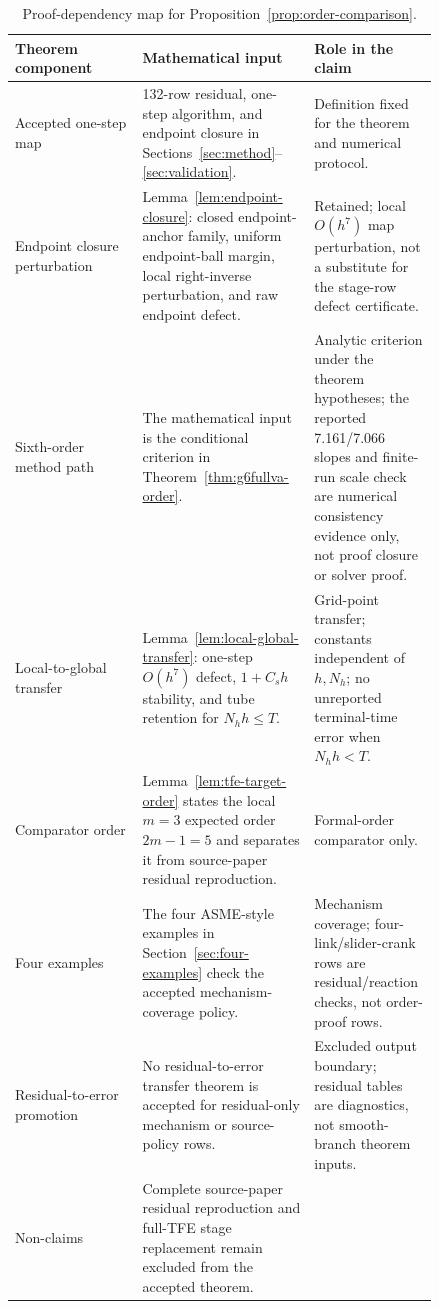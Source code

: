 \documentclass[preprint,12pt]{elsarticle}
\newcommand{\tfe}{TFE}
\begin{document}
\begin{table}[htbp]
\centering
\caption{Proof-dependency map for Proposition~\ref{prop:order-comparison}.}
\label{tab:proof-traceability}
\tiny
\setlength{\tabcolsep}{2pt}
\renewcommand{\arraystretch}{0.68}
\begin{tabular}{P{0.28\linewidth}P{0.36\linewidth}P{0.20\linewidth}}
\toprule
Theorem component & Mathematical input & Role in the claim \\
\midrule
Accepted one-step map &
132-row residual, one-step algorithm, and endpoint closure in
Sections~\ref{sec:method}--\ref{sec:validation}. &
Definition fixed for the theorem and numerical protocol. \\
Endpoint closure perturbation &
Lemma~\ref{lem:endpoint-closure}: closed endpoint-anchor family, uniform
endpoint-ball margin, local right-inverse perturbation, and raw endpoint
defect. &
Retained; local \(O(h^7)\) map perturbation, not a substitute for the
stage-row defect certificate. \\
Sixth-order method path &
The mathematical input is the conditional criterion in
Theorem~\ref{thm:g6fullva-order}. &
Analytic criterion under the theorem hypotheses; the reported 7.161/7.066 slopes and
finite-run scale check are numerical consistency evidence only, not proof
closure or solver proof. \\
Local-to-global transfer &
Lemma~\ref{lem:local-global-transfer}: one-step \(O(h^7)\) defect,
\(1+C_s h\) stability, and tube retention for \(N_hh\le T\). &
Grid-point transfer; constants independent of \(h,N_h\); no unreported
terminal-time error when \(N_hh<T\). \\
Comparator order &
Lemma~\ref{lem:tfe-target-order} states the local $m=3$ expected order
$2m-1=5$ and separates it from source-paper residual reproduction. &
Formal-order comparator only. \\
Four examples &
The four ASME-style examples in Section~\ref{sec:four-examples} check the
accepted mechanism-coverage policy. &
Mechanism coverage; four-link/slider-crank rows are residual/reaction
checks, not order-proof rows. \\
Residual-to-error promotion &
No residual-to-error transfer theorem is accepted for residual-only mechanism
or source-policy rows. &
Excluded output boundary; residual tables are diagnostics, not smooth-branch theorem
inputs. \\
Non-claims &
Complete source-paper residual reproduction and full-\tfe{} stage
replacement remain excluded from the accepted theorem. &

\end{tabular}
\end{table}
\end{document}
